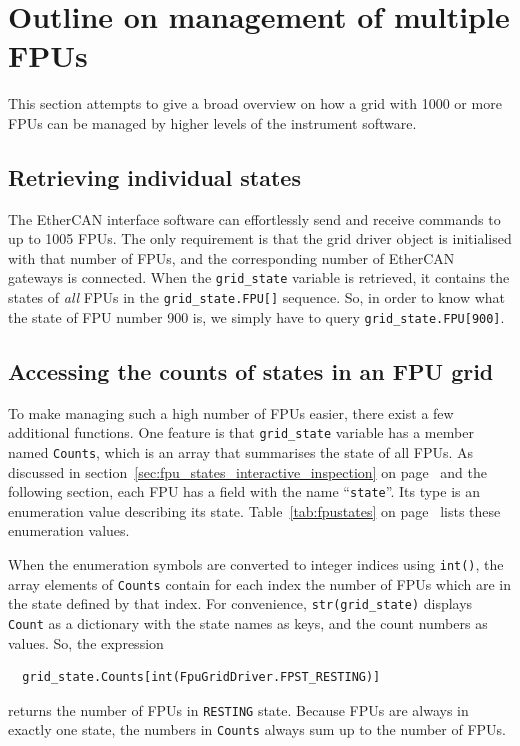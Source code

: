 \documentclass[fontsize=12,a4paper]{scrreprt}
\begin{document}
\chapter{Outline on management of multiple FPUs}
\label{sec:multifpu}
This section attempts to give a broad overview on how a grid with 1000
or more FPUs can be managed by higher levels of the instrument
software.

\section{Retrieving individual states}
The EtherCAN interface software can effortlessly send and receive commands to up
to 1005 FPUs. The only requirement is that the grid driver object is
initialised with that number of FPUs, and the corresponding number of
EtherCAN gateways is connected. When the \texttt{grid\_state} variable
is retrieved, it contains the states of \emph{all} FPUs in the
\verb+grid_state.FPU[]+ sequence. So, in order to know what the state
of FPU number 900 is, we simply have to query
\verb+grid_state.FPU[900]+.

\section{Accessing the counts of states in an FPU grid}
To make managing such a high number of FPUs easier, there exist a few
additional functions. One feature is that \texttt{grid\_state}
variable has a member named \texttt{Counts}, which is an array that
summarises the state of all FPUs. As discussed in
section~\ref{sec:fpu_states_interactive_inspection} on
page~\pageref{sec:fpu_states_interactive_inspection} and the following
section, each FPU has a field with the name ``\texttt{state}''. Its
type is an enumeration value describing its
state. Table~\ref{tab:fpustates} on page~\pageref{tab:fpustates} lists
these enumeration values.

When the enumeration symbols are converted to integer indices using
\texttt{int()}, the array elements of \texttt{Counts} contain for each
index the number of FPUs which are in the state defined by that
index. For convenience, \texttt{str(grid\_state)} displays
\texttt{Count} as a dictionary with the state names as keys, and the
count numbers as values. So, the expression
\begin{verbatim}
  grid_state.Counts[int(FpuGridDriver.FPST_RESTING)]
\end{verbatim}
returns the number of FPUs in \texttt{RESTING} state. Because FPUs are
always in exactly one state, the numbers in \texttt{Counts} always sum
up to the number of FPUs.
\end{document}
